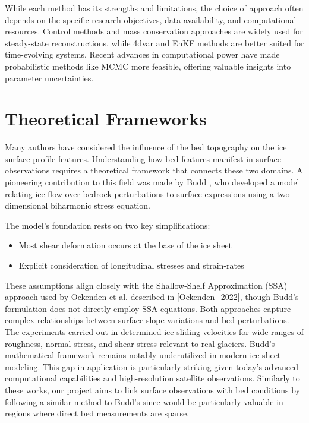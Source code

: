 While each method has its strengths and limitations, the choice of approach often depends on the specific research objectives, data availability, and computational resources. Control methods and mass conservation approaches are widely used for steady-state reconstructions, while 4dvar and EnKF methods are better suited for time-evolving systems. Recent advances in computational power have made probabilistic methods like MCMC more feasible, offering valuable insights into parameter uncertainties.

\newpage
\section{Theoretical Frameworks}
Many authors have considered the influence of the bed topography on the ice surface profile features. Understanding how bed features manifest in surface observations requires a theoretical framework that connects these two domains. A pioneering contribution to this field was made by Budd \cite{Budd_1970}, who developed a model relating ice flow over bedrock perturbations to surface expressions using a two-dimensional biharmonic stress equation. 

The model's foundation rests on two key simplifications:
\begin{itemize}
    \item Most shear deformation occurs at the base of the ice sheet
    \item Explicit consideration of longitudinal stresses and strain-rates
\end{itemize}

These assumptions align closely with the Shallow-Shelf Approximation (SSA) approach used by Ockenden et al. described in \ref{Ockenden_2022}, though Budd's formulation does not directly employ SSA equations. Both approaches capture complex relationships between surface-slope variations and bed perturbations. The experiments carried out in\cite{Budd_1970} determined ice-sliding velocities for wide ranges of roughness, normal stress, and shear stress relevant to real glaciers\cite{Budd_1970}. Budd's mathematical framework remains notably underutilized in modern ice sheet modeling. This gap in application is particularly striking given today's advanced computational capabilities and high-resolution satellite observations. 
Similarly to these works, our project aims to link surface observations with bed conditions by following a similar method to Budd's since would be particularly valuable in regions where direct bed measurements are sparse.


